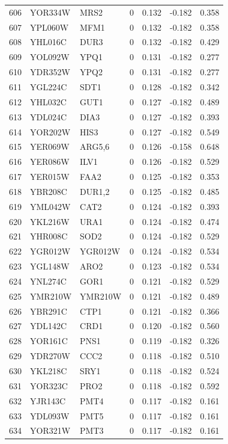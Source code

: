 \begin{longtable}{rllrrrr}
606 & YOR334W & MRS2 & 0 & 0.132 & -0.182 & 0.358\\
607 & YPL060W & MFM1 & 0 & 0.132 & -0.182 & 0.358\\
608 & YHL016C & DUR3 & 0 & 0.132 & -0.182 & 0.429\\
609 & YOL092W & YPQ1 & 0 & 0.131 & -0.182 & 0.277\\
610 & YDR352W & YPQ2 & 0 & 0.131 & -0.182 & 0.277\\
611 & YGL224C & SDT1 & 0 & 0.128 & -0.182 & 0.342\\
612 & YHL032C & GUT1 & 0 & 0.127 & -0.182 & 0.489\\
613 & YDL024C & DIA3 & 0 & 0.127 & -0.182 & 0.393\\
614 & YOR202W & HIS3 & 0 & 0.127 & -0.182 & 0.549\\
615 & YER069W & ARG5,6 & 0 & 0.126 & -0.158 & 0.648\\
616 & YER086W & ILV1 & 0 & 0.126 & -0.182 & 0.529\\
617 & YER015W & FAA2 & 0 & 0.125 & -0.182 & 0.353\\
618 & YBR208C & DUR1,2 & 0 & 0.125 & -0.182 & 0.485\\
619 & YML042W & CAT2 & 0 & 0.124 & -0.182 & 0.393\\
620 & YKL216W & URA1 & 0 & 0.124 & -0.182 & 0.474\\
621 & YHR008C & SOD2 & 0 & 0.124 & -0.182 & 0.529\\
622 & YGR012W & YGR012W & 0 & 0.124 & -0.182 & 0.534\\
623 & YGL148W & ARO2 & 0 & 0.123 & -0.182 & 0.534\\
624 & YNL274C & GOR1 & 0 & 0.121 & -0.182 & 0.529\\
625 & YMR210W & YMR210W & 0 & 0.121 & -0.182 & 0.489\\
626 & YBR291C & CTP1 & 0 & 0.121 & -0.182 & 0.366\\
627 & YDL142C & CRD1 & 0 & 0.120 & -0.182 & 0.560\\
628 & YOR161C & PNS1 & 0 & 0.119 & -0.182 & 0.326\\
629 & YDR270W & CCC2 & 0 & 0.118 & -0.182 & 0.510\\
630 & YKL218C & SRY1 & 0 & 0.118 & -0.182 & 0.524\\
631 & YOR323C & PRO2 & 0 & 0.118 & -0.182 & 0.592\\
632 & YJR143C & PMT4 & 0 & 0.117 & -0.182 & 0.161\\
633 & YDL093W & PMT5 & 0 & 0.117 & -0.182 & 0.161\\
634 & YOR321W & PMT3 & 0 & 0.117 & -0.182 & 0.161\\

\end{longtable}

